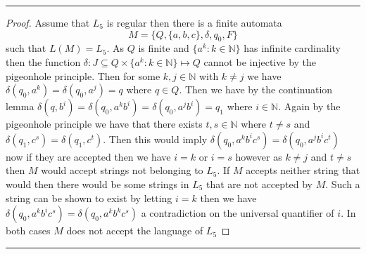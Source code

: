 \documentclass[11pt,twoside]{article}
\newcounter{problem}
\newcommand{\solution}{\bigskip\hrule\bigskip}
\newcommand{\problembreak}{\bigskip\hrule\bigskip}
\begin{document}
\solution

\begin{proof}
    Assume that $L_5$ is regular then there is a finite automata 
    \[M=\{Q,\{a,b,c\},\delta, q_0,F\}
    \]
    such that $L(M)=L_5$.
    As $Q$ is finite and $\{a^k:k\in \mathbb{N}\}$ has infinite cardinality then the function $\delta:J\subseteq Q\times \{a^k:k\in \mathbb{N}\}\mapsto Q$ cannot be injective by the pigeonhole principle. Then for some $k,j\in \mathbb{N}$ with $k\not = j$ we have $\delta(q_0,a^k)=\delta(q_0,a^j)=q$ where $q\in Q$. Then we have by the continuation lemma $\delta(q,b^i)=\delta(q_0,a^kb^i)=\delta(q_0,a^jb^i)=q_1$ where $i\in \mathbb{N}$. Again by the pigeonhole principle we have that there exists $t,s\in \mathbb{N}$ where $t\not = s$ and $\delta(q_1,c^s)=\delta(q_1,c^t)$. Then this would imply $\delta(q_0,a^kb^ic^s)=\delta(q_0,a^jb^ic^t)$ now if 
    they are accepted then we have $i=k$ or $i=s$ however as $k\not = j$ and $t\not =s$ then $M$ would accept strings not belonging to $L_5$. If $M$ accepts neither string that would then there would be some strings in $L_5$ that are not accepted by $M$. Such a string can be shown to exist by letting $i=k$ then we have $\delta(q_0,a^kb^ic^s)=\delta(q_0,a^kb^kc^s)$ a contradiction on the universal quantifier of $i$. In both cases $M$ does not accept the language of $L_5$
\end{proof}


\problembreak
\end{document}
